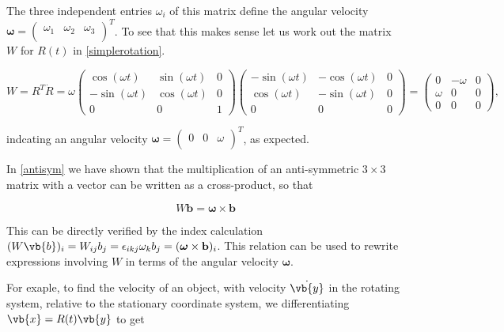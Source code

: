 \documentclass[a4paper,12pt]{report}
\begin{document}
The three independent entries \(\omega_i\) of this matrix define the angular velocity \(\boldsymbol{\omega} = \begin{pmatrix}
    \omega _{1}  & \omega _{2}  & \omega _{3}   \\
\end{pmatrix}^T\). To see that this makes sense let us work out the matrix \( W \) for \(R(t)\) in \cref{simplerotation}.

\begin{equation}
W = R^T \dot{R} = \omega
\begin{pmatrix}
\cos(\omega t) & \sin(\omega t) & 0 \\
-\sin(\omega t) & \cos(\omega t) & 0 \\
0 & 0 & 1
\end{pmatrix}
\begin{pmatrix}
-\sin(\omega t) & -\cos(\omega t) & 0 \\
\cos(\omega t) & -\sin(\omega t) & 0 \\
0 & 0 & 0
\end{pmatrix}
=
\begin{pmatrix}
0 & -\omega & 0 \\
\omega & 0 & 0 \\
0 & 0 & 0
\end{pmatrix},
\end{equation}

indcating an angular velocity \(\boldsymbol{\omega } = \begin{pmatrix}
    0 & 0 &  \omega  \\
\end{pmatrix}^T \), as expected.

In \cref{antisym} we have shown that the multiplication of an anti-symmetric \(3 \times 3\) matrix with a vector can be written as a cross-product, so that

\begin{equation}
W \mathbf{b} = \boldsymbol{\omega} \times \mathbf{b}
\end{equation}

This can be directly verified by the index calculation \( (W\vb{b})_{i} = W_{ij} b_j = \epsilon_{ikj} \omega_k b_j = (\boldsymbol{\omega} \times \mathbf{b})_i \). This relation can be used to rewrite expressions involving \( W \) in terms of the angular velocity \(\boldsymbol{\omega}\).

For exaple, to find the velocity of an object, with velocity \(\dot{\vb{y} } \) in the rotating system, relative to the stationary coordinate system, we differentiating \(\vb{x} = R(t)\vb{y} \) to get
\end{document}
